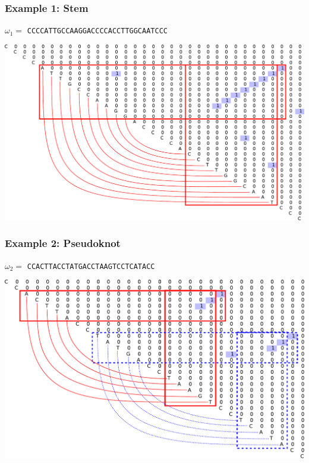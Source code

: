 \documentclass[xcolor=table]{beamer}
\begin{document}
\begin{frame}[fragile]
  \transwipe[direction=90]
  \frametitle{Example 1: Stem}
\centering
 $\omega_1=$ \texttt{CCCCATTGCCAAGGACCCCACCTTGGCAATCCC}
\vspace{1cm}

\includegraphics[width=.8\textwidth]{pictures/4.pdf}

\end{frame}

\begin{frame}[fragile]
  \transwipe[direction=90]
  \frametitle{Example 2: Pseudoknot}
\centering
 $\omega_2=$ \texttt{CCACTTACCTATGACCTAAGTCCTCATACC}
\vspace{1cm}

\includegraphics[width=.8\textwidth]{pictures/5.pdf}

\end{frame}
\end{document}
